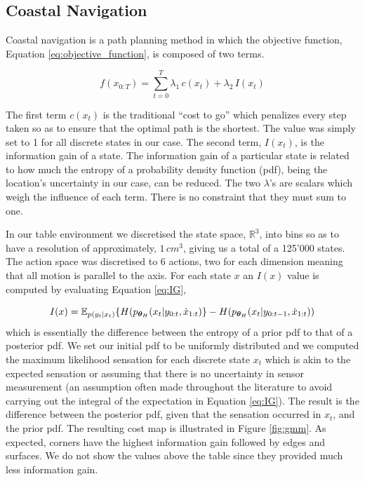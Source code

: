 \subsection{Coastal Navigation}\label{chap3:costal_policy}

Coastal navigation \citep{CostalNavigation1999} is a path planning method in which the objective function, 
Equation \ref{eq:objective_function}, is composed of two terms.

\begin{equation}\label{eq:objective_function}
 f(x_{0:T}) = \sum\limits_{t=0}^{T} \lambda_1 \, c(x_t) + \lambda_2 \, I(x_t)
\end{equation}

The first term $c(x_t)$ is the traditional ``cost to go'' which penalizes every step taken so as to ensure that the
optimal path is the shortest. The value was simply set to 1 for all discrete states in our case. The second term, $I(x_t)$, 
is the information gain of a state. The information gain of a particular state is related to how much 
the entropy of a probability density function (pdf), being the location's uncertainty in our case, can be reduced. The two $\lambda$'s are scalars which weigh the influence 
of each term. There is no constraint that they must sum to one.

In our table environment we discretised the state space, $\mathbb{R}^3$, into bins so as to have a resolution of approximately, $1\, cm^3$, giving us a total of a 125'000
states. The action space was discretised to 6 actions, two for each dimension meaning that all motion is parallel to the axis. For each state $x$ an $I(x)$ value is
computed by evaluating Equation \ref{eq:IG},


\begin{equation}\label{eq:IG}
 I(x) = \mathbb{E}_{p(y_t|x_t)}\{ H(p_{\boldsymbol{\theta}_H}(x_t|y_{0:t},\dot{x}_{1:t}) \} - H(p_{\boldsymbol{\theta}_H}(x_t|y_{0:t-1},\dot{x}_{1:t}))
\end{equation}
which is essentially the difference between the entropy of a prior pdf to that of a posterior pdf.
We set our initial pdf to be uniformly distributed and  we computed the maximum likelihood sensation for each discrete state $x_t$
which is akin to the expected sensation or assuming that there is no uncertainty in sensor measurement (an assumption 
often made throughout the literature to avoid carrying out the integral of the expectation in Equation \ref{eq:IG}).
The result is the difference between the posterior pdf, given that the sensation occurred in $x_t$, and the prior pdf. The resulting cost
map is illustrated in Figure \ref{fig:gmm}. As expected, corners have the highest information gain followed by edges and surfaces. 
We do not show the values above the table since they provided much less information gain.

